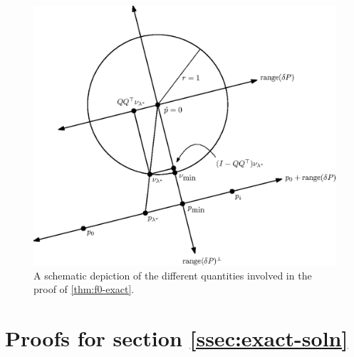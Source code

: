 \documentclass[sisc-eikonal.tex]{subfiles}
\begin{document}
\begin{figure}
  \centering
  \includegraphics[width=0.65\linewidth]{f0-exact.eps}
  \caption{A schematic depiction of the different quantities involved
    in the proof of \cref{thm:f0-exact}.}\label{fig:f0-exact}
\end{figure}

\section{Proofs for section \ref{ssec:exact-soln}}
\end{document}
